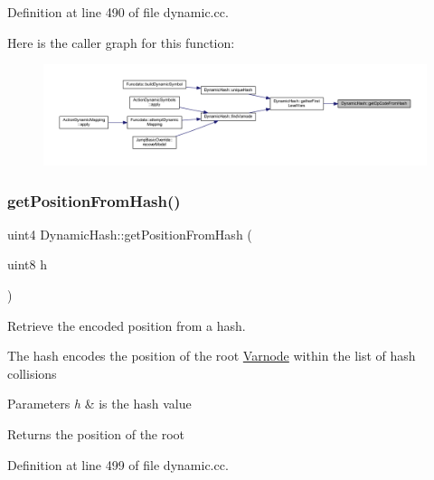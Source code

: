 Definition at line 490 of file dynamic.\+cc.

Here is the caller graph for this function\+:
\nopagebreak
\begin{figure}[H]
\begin{center}
\leavevmode
\includegraphics[width=350pt]{class_dynamic_hash_acf0da7edbf8321e9489e819ffbb5111b_icgraph}
\end{center}
\end{figure}
\mbox{\label{class_dynamic_hash_a82c7a255745be65f7395d489a0bd4201}} 
\subsubsection{\texorpdfstring{getPositionFromHash()}{getPositionFromHash()}}
{\footnotesize\ttfamily uint4 Dynamic\+Hash\+::get\+Position\+From\+Hash (\begin{DoxyParamCaption}\item[{uint8}]{h }\end{DoxyParamCaption})\hspace{0.3cm}{\ttfamily [static]}}



Retrieve the encoded position from a hash. 

The hash encodes the position of the root \mbox{\hyperlink{class_varnode}{Varnode}} within the list of hash collisions 
\begin{DoxyParams}{Parameters}
{\em h} & is the hash value \\
\hline
\end{DoxyParams}
\begin{DoxyReturn}{Returns}
the position of the root 
\end{DoxyReturn}


Definition at line 499 of file dynamic.\+cc.


